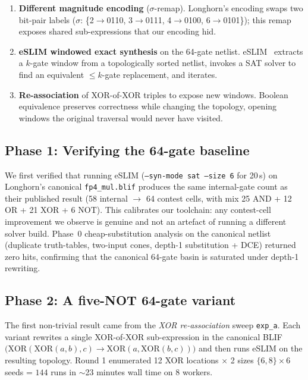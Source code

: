 \documentclass[11pt]{article}
\begin{document}
\begin{enumerate}
  \item \textbf{Different magnitude encoding} ($\sigma$-remap).
        Longhorn's encoding swaps two bit-pair labels
        ($\sigma$: \{2$\to$0110, 3$\to$0111, 4$\to$0100,
         6$\to$0101\}); this remap exposes shared sub-expressions
        that our encoding hid.
  \item \textbf{eSLIM windowed exact synthesis} on the 64-gate
        netlist. eSLIM~\cite{reichl2024eslim} extracts a
        $k$-gate window from a topologically sorted netlist,
        invokes a SAT solver to find an equivalent
        $\le k$-gate replacement, and iterates.
  \item \textbf{Re-association} of XOR-of-XOR triples to expose
        new windows. Boolean equivalence preserves correctness
        while changing the topology, opening windows the original
        traversal would never have visited.
\end{enumerate}

\subsection{Phase 1: Verifying the 64-gate baseline}

We first verified that running eSLIM (\texttt{--syn-mode sat
--size 6} for 20\,s) on Longhorn's canonical
\texttt{fp4\_mul.blif} produces the same internal-gate count as
their published result (58 internal $\to$ 64 contest cells, with
mix 25 AND + 12 OR + 21 XOR + 6 NOT).
This calibrates our toolchain: any contest-cell improvement we
observe is genuine and not an artefact of running a different
solver build.
Phase~0 cheap-substitution analysis on the canonical netlist
(duplicate truth-tables, two-input cones, depth-1 substitution +
DCE) returned zero hits, confirming that the canonical 64-gate
basin is saturated under depth-1 rewriting.

\subsection{Phase 2: A five-NOT 64-gate variant}

The first non-trivial result came from the \emph{XOR re-association}
sweep \texttt{exp\_a}.
Each variant rewrites a single XOR-of-XOR sub-expression in the
canonical BLIF
$\bigl(\text{XOR}(\text{XOR}(a,b),c) \to \text{XOR}(a,\text{XOR}(b,c))\bigr)$
and then runs eSLIM on the resulting topology.
Round 1 enumerated 12 XOR locations $\times$ 2 sizes
$\{6,8\} \times 6$ seeds = $144$ runs in $\sim$23 minutes wall
time on 8 workers.
\end{document}
